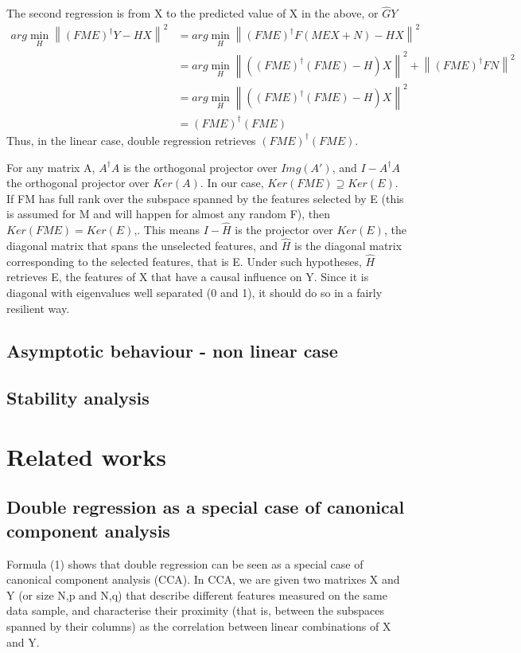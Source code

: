 \documentclass{article}
\begin{document}
The second regression is from X to the predicted value of X in the above, or $\hat G Y$
\begin{equation}
\begin{aligned}
arg \min_H \left \| (FME)^{\dagger}Y - HX \right \|^2 &= arg \min_H \left \| (FME)^{\dagger}F(MEX+N) - HX \right \|^2 \\
&= arg \min_H \left \| ((FME)^{\dagger}(FME)-H)X \right \| ^2 + \left \| (FME)^{\dagger}FN \right \| ^2\\
&= arg \min_H \left \| ((FME)^{\dagger}(FME)-H)X \right \| ^2\\
&=(FME)^{\dagger}(FME)
\end{aligned}
\end{equation}
Thus, in the linear case, double regression retrieves $(FME)^{\dagger}(FME)$. 

For any matrix A, $A^\dagger A$ is the orthogonal projector over $Img(A')$, and $I-A^\dagger A$ the orthogonal projector over $Ker(A)$. In our case, $Ker(FME)\supseteq Ker(E)$. If FM has full rank over the subspace spanned by the features selected by E (this is assumed for M and will happen for almost any random F), then $Ker(FME) = Ker(E)$,. This means $I - \hat H$ is the projector over $Ker(E)$, the diagonal matrix that spans the unselected features, and $\hat H$ is the diagonal matrix corresponding to the selected features, that is E. Under such hypotheses, $\hat H$ retrieves E, the features of X that have a causal influence on Y. Since it is diagonal with eigenvalues well separated (0 and 1), it should do so in a fairly resilient way.

\subsection{Asymptotic behaviour - non linear case}

\subsection{Stability analysis}


\section{Related works}
\subsection{Double regression as a special case of canonical component analysis}
Formula (1) shows that double regression can be seen as a special case of canonical component analysis (CCA). In CCA, we are given two matrixes X and Y (or size N,p and N,q) that describe different features measured on the same data sample, and characterise their proximity (that is, between the subspaces spanned by their columns) as the correlation between linear combinations of X and Y. 
\end{document}
